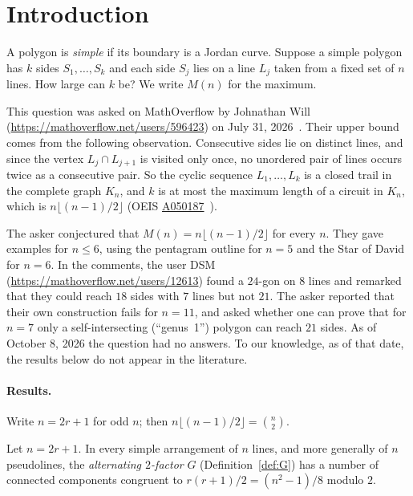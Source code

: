 \section{Introduction}\label{sec:intro}

A polygon is \emph{simple} if its boundary is a Jordan curve. Suppose a simple polygon has $k$ sides
$S_1,\dots,S_k$ and each side $S_j$ lies on a line $L_j$ taken from a fixed set of $n$ lines. How
large can $k$ be? We write $M(n)$ for the maximum.

This question was asked on MathOverflow by Johnathan Will (\url{https://mathoverflow.net/users/596423})
on July 31, 2026~\cite{MO513798}. Their upper bound comes from the following observation. Consecutive
sides lie on distinct lines, and since the vertex $L_j\cap L_{j+1}$ is visited only once, no unordered
pair of lines occurs twice as a consecutive pair. So the cyclic sequence $L_1,\dots,L_k$ is a closed
trail in the complete graph $K_n$, and $k$ is at most the maximum length of a circuit in $K_n$, which is
$n\lfloor (n-1)/2\rfloor$ (OEIS \href{https://oeis.org/A050187}{A050187}~\cite{A050187}).

The asker conjectured that $M(n)=n\lfloor (n-1)/2\rfloor$ for every $n$. They gave examples for
$n\le 6$, using the pentagram outline for $n=5$ and the Star of David for $n=6$. In the comments, the user
DSM (\url{https://mathoverflow.net/users/12613}) found a $24$-gon on $8$ lines and remarked that they
could reach $18$ sides with $7$ lines but not $21$. The asker reported that their own construction
fails for $n=11$, and asked whether one can prove that for $n=7$ only a self-intersecting
(``genus~1'') polygon can reach $21$ sides. As of October 8, 2026 the question had no answers. To our
knowledge, as of that date, the results below do not appear in the literature.

\paragraph{Results.} Write $n=2r+1$ for odd $n$; then $n\lfloor (n-1)/2\rfloor=\binom n2$.

\begin{theorem}\label{thm:parity}
Let $n=2r+1$. In every simple arrangement of $n$ lines, and more generally of $n$ pseudolines, the
\emph{alternating $2$-factor} $G$ (Definition~\ref{def:G}) has a number of connected components congruent to
$r(r+1)/2=(n^2-1)/8$ modulo $2$.
\end{theorem}

